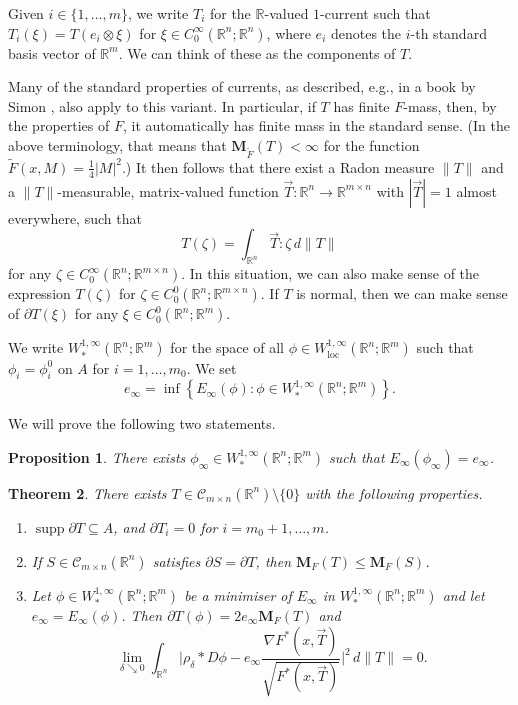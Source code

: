 \documentclass[a4paper]{article}
\newcommand{\R}{\mathbb{R}}
\newcommand{\M}{\mathbf{M}}
\newcommand{\loc}{\mathrm{loc}}
\newcommand{\grad}{\nabla}
\newcommand{\ncrt}{\mathcal{C}}
\DeclareMathOperator{\supp}{supp}
\newcommand{\set}[2]{\left\{ #1 \colon #2 \right\}}
\newtheorem{theorem}{Theorem}
\newtheorem{proposition}[theorem]{Proposition}
\theoremstyle{definition}
\theoremstyle{remark}
\begin{document}
Given $i \in \{1, \dotsc, m\}$, we write $T_i$ for the $\R$-valued
$1$-current such that $T_i(\xi) = T(e_i \otimes \xi)$ for
$\xi \in C_0^\infty(\R^n; \R^n)$, where $e_i$ denotes the $i$-th standard basis
vector of $\R^m$. We can think of these as the components of $T$. 

Many of the standard properties of currents, as described, e.g., in a book
by Simon \cite{Simon:83}, also apply to this variant. In particular, if $T$ has
finite $F$-mass, then, by the properties of $F$, it automatically has finite
mass in the standard sense. (In the above terminology, that means that $\M_{\tilde{F}}(T) < \infty$
for the function $\tilde{F}(x, M) = \frac{1}{4} |M|^2$.) It then follows that
there exist a Radon measure $\|T\|$ and a $\|T\|$-measurable, matrix-valued function
$\vec{T} \colon \R^n \to \R^{m \times n}$ with $|\vec{T}| = 1$ almost
everywhere, such that
\[
T(\zeta) = \int_{\R^n} \vec{T} : \zeta \, d\|T\|
\]
for any $\zeta \in C_0^\infty(\R^n; \R^{m \times n})$. In this situation, we can
also make sense of the expression $T(\zeta)$ for $\zeta \in C_0^0(\R^n; \R^{m \times n})$.
If $T$ is normal, then we can make sense of $\partial T(\xi)$ for any $\xi \in C_0^0(\R^n; \R^m)$.

We write $W_*^{1, \infty}(\R^n; \R^m)$ for the space of all
$\phi \in W_\loc^{1, \infty}(\R^n; \R^m)$ such that $\phi_i = \phi_i^0$ on
$A$ for $i = 1, \dotsc, m_0$. We set
\[
e_\infty = \inf\set{E_\infty(\phi)}{\phi \in W_*^{1, \infty}(\R^n; \R^m)}.
\]

We will prove the following two statements.

\begin{proposition} \label{prp:existence}
There exists $\phi_\infty \in W_*^{1, \infty}(\R^n; \R^m)$ such that $E_\infty(\phi_\infty) = e_\infty$.
\end{proposition}

\begin{theorem} \label{thm:current}
There exists $T \in \ncrt_{m \times n}(\R^n) \setminus \{0\}$ with the following properties.
\begin{enumerate}
\item $\supp \partial T \subseteq A$, and $\partial T_i = 0$ for
$i = m_0 + 1, \dotsc, m$.
\item If $S \in \ncrt_{m \times n}(\R^n)$ satisfies $\partial S = \partial T$,
then $\M_F(T) \le \M_F(S)$.
\item Let $\phi \in W_*^{1, \infty}(\R^n; \R^m)$ be a minimiser of
$E_\infty$ in $W_*^{1, \infty}(\R^n; \R^m)$ and let
$e_\infty = E_\infty(\phi)$. Then $\partial T(\phi) = 2 e_\infty \M_F(T)$ and
\[
\lim_{\delta \searrow 0} \int_{\R^n} \Biggl|\rho_\delta * D\phi - e_\infty \frac{\grad F^*(x, \vec{T})}{\sqrt{F^*(x, \vec{T})}}\Biggr|^2 \, d\|T\| = 0.
\]
\end{enumerate}
\end{theorem}
\end{document}
